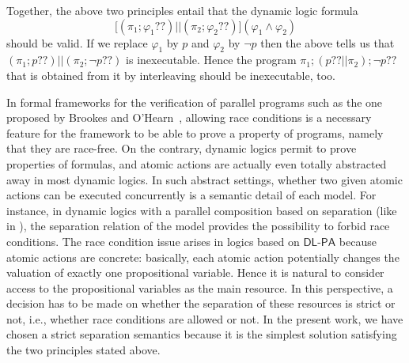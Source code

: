 \documentclass{llncs}
\newcommand{\pll}{ {||} }							%
\newcommand{\testendo}{?\!\!?}			%
\newcommand{\Dlpa}{\ensuremath{\mathsf{DL\text{-}PA}}\xspace}
\newcommand{\ah}[1]{\**\marginpar{\textbf{AH:} #1}}
\newcommand{\lbox}[1]{ \big[ #1 \big] }
\renewcommand{\phi}{\varphi}
\begin{document}
Together, the above two principles entail that the dynamic logic formula
$$ \lbox{ (\pi_1 ; \phi_1 \testendo ) \pll (\pi_2 ; \phi_2 \testendo ) } (\phi_1 \land \phi_2) $$
should be valid. 
If we replace $\phi_1$ by $p$ and $\phi_2$ by $\lnot p$ then the above tells us that 
$(\pi_1 ; p \testendo ) \pll (\pi_2 ; \lnot p \testendo )$ is inexecutable. 
Hence the program
$\pi_1 ; (p \testendo \pll \pi_2) ; \lnot p \testendo $ 
that is obtained from it by interleaving should be inexecutable, too. 

In formal frameworks for the verification of parallel programs such as the one proposed by Brookes 
and O'Hearn~\cite{Brookes04,OHearn04}, allowing race conditions is a necessary feature for the 
framework to be able to prove a property of programs, namely that they are race-free. 
On the contrary, dynamic logics permit to prove properties of formulas, and atomic actions are actually even totally abstracted away in most dynamic logics. 
In such abstract settings,
whether two given atomic actions can be executed concurrently is a semantic detail of each model.
For instance, in dynamic logics with a parallel composition based on separation (like in
\cite{DBLP:journals/entcs/BenevidesFV11,Boudou16,DBLP:journals/logcom/BalbianiB18}),
the separation relation of the model provides the possibility to forbid race conditions.
The race condition issue arises in logics based on \Dlpa because atomic actions are concrete:
basically, each atomic action potentially changes the valuation of exactly one propositional variable.
Hence it is natural to consider access to the propositional variables as the main resource. 
In this perspective, a decision has to be made on whether the separation of these resources is strict or not, 
i.e., whether race conditions are allowed or not.
In the present work, we have chosen a strict separation semantics because it is the simplest solution satisfying
the two principles stated above.
\end{document}
